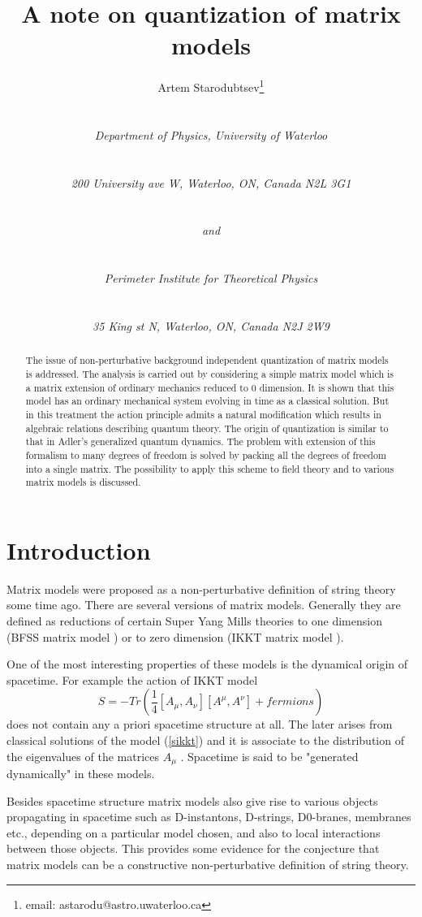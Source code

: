 \documentclass[a4paper,11pt]{article}
\title{A note on quantization of matrix models}
\author{Artem Starodubtsev\thanks{email: astarodu@astro.uwaterloo.ca} \\
 \\ \centerline{\footnotesize \it Department of Physics, University of Waterloo} \\ \centerline{\footnotesize \it 200
University ave W, Waterloo, ON, Canada N2L 3G1} \\
\centerline{\footnotesize \it and} \\
\centerline{\footnotesize \it Perimeter Institute for
Theoretical Physics} \\
\centerline{\footnotesize \it 35 King st N, Waterloo, ON, Canada
N2J 2W9 }}
\date{}
\begin{document}
\maketitle

\begin{abstract}
The issue of non-perturbative background independent quantization
of matrix models is addressed. The analysis is carried out by
considering a simple matrix model which is a matrix extension of
ordinary mechanics reduced to 0 dimension.   It is shown that this
model has an ordinary mechanical system  evolving in time as a
classical solution. But in this treatment the action principle
admits a natural modification which results in algebraic relations
describing quantum theory. The origin of quantization is similar
to that in Adler's generalized quantum dynamics. The problem with
extension of this formalism to many degrees of freedom is solved
by packing all the degrees of freedom into a single matrix. The
possibility to apply this scheme to field theory and to various
matrix models is discussed.
\end{abstract}

\section{Introduction}
Matrix models were proposed as a non-perturbative definition of
string theory some time ago. There are several versions of matrix
models. Generally they are defined as reductions of certain Super
Yang Mills theories to one dimension (BFSS matrix model
\cite{BFSS}) or to zero dimension (IKKT matrix model \cite{IKKT}).

One of the most interesting properties of these models is the
dynamical origin of spacetime. For example the action of IKKT
model
\begin{equation}
S=-Tr ( \frac{1}{4} [A_\mu,A_\nu][A^\mu,A^\nu] + fermions )
\label{sikkt}
\end{equation}
does not contain any a priori spacetime structure at all. The
later arises from classical solutions of the model (\ref{sikkt})
and it is associate to the distribution of the eigenvalues of the
matrices $A_\mu$ \cite{stiib}. Spacetime is said to be "generated
dynamically" in these models.

Besides spacetime structure matrix models also give rise to
various objects propagating in spacetime such as D-instantons,
D-strings, D0-branes, membranes etc., depending on a particular
model chosen, and also to local interactions between those
objects. This provides some evidence for the conjecture that
matrix models can be a constructive non-perturbative definition of
string theory.
\end{document}
